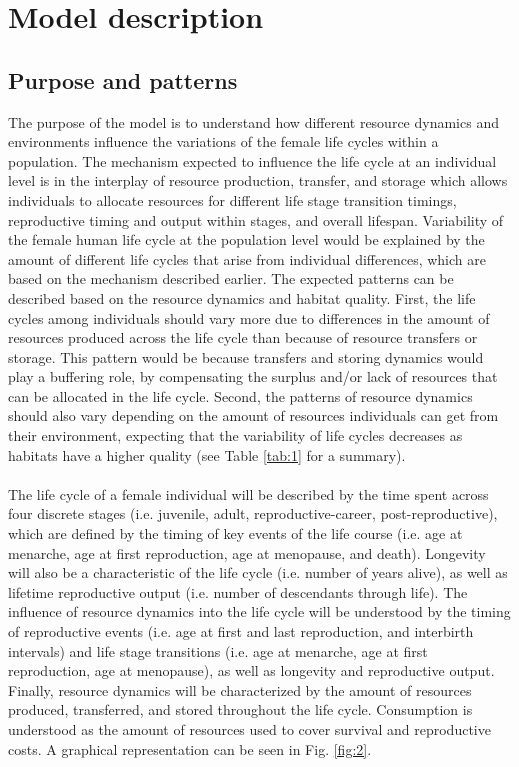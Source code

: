 \documentclass{article}
\begin{document}
\section{Model description}

\subsection{Purpose and patterns}

The purpose of the model is to understand how different resource dynamics and environments influence the variations of the female life cycles within a population. The mechanism expected to influence the life cycle at an individual level is in the interplay of resource production, transfer, and storage which allows individuals to allocate resources for different life stage transition timings, reproductive timing and output within stages, and overall lifespan. Variability of the female human life cycle at the population level would be explained by the amount of different life cycles that arise from individual differences, which are based on the mechanism described earlier. The expected patterns can be described based on the resource dynamics and habitat quality. First, the life cycles among individuals should vary more due to differences in the amount of resources produced across the life cycle than because of resource transfers or storage. This pattern would be because transfers and storing dynamics would play a buffering role, by compensating the surplus and/or lack of resources that can be allocated in the life cycle. Second, the patterns of resource dynamics should also vary depending on the amount of resources individuals can get from their environment, expecting that the variability of life cycles decreases as habitats have a higher quality (see Table \ref{tab:1} for a summary).
\\\\
The life cycle of a female individual will be described by the time spent across four discrete stages (i.e. juvenile, adult, reproductive-career, post-reproductive), which are defined by the timing of key events of the life course (i.e. age at menarche, age at first reproduction, age at menopause, and death). Longevity will also be a characteristic of the life cycle (i.e. number of years alive), as well as lifetime reproductive output (i.e. number of descendants through life). The influence of resource dynamics into the life cycle will be understood by the timing of reproductive events (i.e. age at first and last reproduction, and interbirth intervals) and life stage transitions (i.e. age at menarche, age at first reproduction, age at menopause), as well as longevity and reproductive output. Finally, resource dynamics will be characterized by the amount of resources produced, transferred, and stored throughout the life cycle. Consumption is understood as the amount of resources used to cover survival and reproductive costs. A graphical representation can be seen in Fig. \ref{fig:2}.
\end{document}
